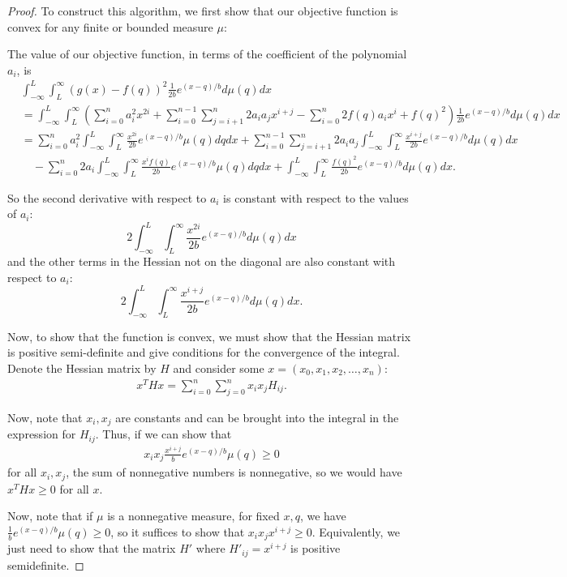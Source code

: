 \documentclass[11pt]{article}
\begin{document}
\begin{proof}
To construct this algorithm, we first show that our objective function is convex for any finite or bounded measure $\mu$:

The value of our objective function, in terms of the coefficient of the polynomial $a_i$, is
\begin{align}
&\int_{-\infty}^L \int_L^\infty (g(x)-f(q))^2 \frac{1}{2b} e^{(x-q)/b} d\mu(q) dx \nonumber \\ 
&=  \int_{-\infty}^L \int_L^\infty \left(\sum_{i=0}^n a^2_i x^{2i} + \sum_{i=0}^{n-1} \sum_{j=i+1}^n 2a_ia_j x^{i+j}  - \sum_{i=0}^n 2f(q) a_i x^i + f(q)^2\right) \frac{1}{2b} e^{(x-q)/b} d\mu(q)dx\\ 
&= \sum_{i=0}^n a_i^2 \int_{-\infty}^L \int_L^\infty \frac{x^{2i}}{2b} e^{(x-q)/b} \mu(q) dq dx + \sum_{i=0}^{n-1} \sum_{j=i+1}^n 2a_ia_j \int_{-\infty}^L \int_L^\infty \frac{x^{i+j}}{2b} e^{(x-q)/b} d\mu(q)dx \\ 
&\quad- \sum_{i=0}^n 2a_i \int_{-\infty}^L \int_L^\infty \frac{x^if(q)}{2b} e^{(x-q)/b} \mu(q) dq dx + \int_{-\infty}^L \int_L^\infty \frac{f(q)^2}{2b}e^{(x-q)/b} d\mu(q)dx. \nonumber
\end{align}

So the second derivative with respect to $a_i$ is constant with respect to the values of $a_i$: $$2\int_{-\infty}^L \int_L^\infty \frac{x^{2i}}{2b} e^{(x-q)/b} d\mu(q) dx$$
and the other terms in the Hessian not on the diagonal are also constant with respect to $a_i$:
$$2\int_{-\infty}^L \int_L^\infty \frac{x^{i+j}}{2b} e^{(x-q)/b} d\mu(q) dx.$$


Now, to show that the function is convex, we must show that the Hessian matrix is positive semi-definite and give conditions for the convergence of the integral. Denote the Hessian matrix by $H$ and consider some $x = (x_0,x_1, x_2, \dots, x_n)$:
\begin{align}
    x^T H x = \sum_{i=0}^n \sum_{j=0}^n x_ix_j H_{ij}.
\end{align}

Now, note that $x_i,x_j$ are constants and can be brought into the integral in the expression for $H_{ij}$. Thus, if we can show that
\begin{align}
    x_ix_j \frac{x^{i+j}}{b}e^{(x-q)/b} \mu(q) \ge 0
\end{align}
for all $x_i,x_j$, the sum of nonnegative numbers is nonnegative, so we would have $x^T H x \ge 0$ for all $x$.

Now, note that if $\mu$ is a nonnegative measure, for fixed $x,q$, we have $\frac{1}{b} e^{(x-q)/b} \mu(q) \ge 0$, so it suffices to show that $x_i x_j x^{i+j} \ge 0$. Equivalently, we just need to show that the matrix $H'$ where $H'_{ij} = x^{i+j}$ is positive semidefinite.


\end{proof}
\end{document}

